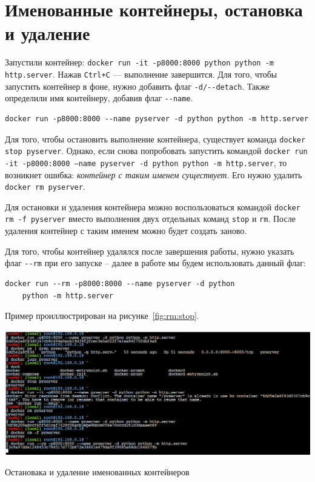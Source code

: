 \section{Именованные контейнеры, остановка и удаление}
Запустили контейнер:
\texttt{docker run -it -p8000:8000 python python -m http.server}.
Нажав \texttt{Ctrl+C} --- выполнение завершится.
Для того, чтобы запустить контейнер в фоне, нужно добавить флаг
\verb|-d/--detach|.
Также определили имя контейнеру, добавив флаг \verb|--name|.

\begin{verbatim}
docker run -p8000:8000 --name pyserver -d python python -m http.server
\end{verbatim}

Для того, чтобы остановить выполнение контейнера, существует команда
\texttt{docker stop pyserver}. Однако, если снова попробовать запустить
командой \texttt{docker run -it -p8000:8000 --name pyserver -d python
python -m http.server}, то возникнет ошибка:
\textit{контейнер с таким именем существует}.
Его нужно удалить \texttt{docker rm pyserver}.\par
Для остановки и удаления контейнера можно воспользоваться командой
\texttt{docker rm -f pyserver} вместо выполнения двух отдельных команд
\texttt{stop} и \texttt{rm}. После удаления контейнер с таким именем можно
будет создать заново.\par
Для того, чтобы контейнер удалялся после завершения работы, нужно указать
флаг \verb|--rm| при его запуске -- далее в работе мы будем использовать
данный флаг:

\begin{verbatim}
docker run --rm -p8000:8000 --name pyserver -d python
	python -m http.server
\end{verbatim}

Пример проиллюстрирован на рисунке~\ref{fig:rm:stop}.

\begin{image}
	\includegraphics[width=1\textwidth]{Screenshot from 2023-04-15 15-46-04}
	\caption{Остановака и удаление именованных контейнеров}
	\label{fig:rm:stop}
\end{image}

